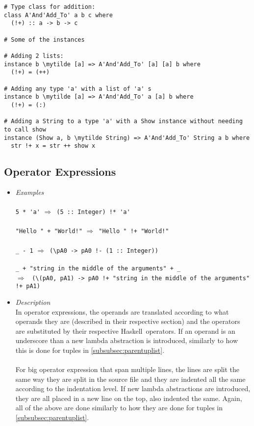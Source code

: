 \documentclass[diploma]{softlab-thesis}
\def\H{Haskell}
\def\lra{$\Longrightarrow$\ }
\newcommand{\mytilde}{$\sim$}
\begin{document}
\newpage
\begin{Verbatim}[commandchars=\\\{\}]
# Type class for addition:
class A'And'Add_To' a b c where
  (!+) :: a -> b -> c

# Some of the instances

# Adding 2 lists:
instance b \mytilde [a] => A'And'Add_To' [a] [a] b where
  (!+) = (++)

# Adding any type 'a' with a list of 'a' s
instance b \mytilde [a] => A'And'Add_To' a [a] b where
  (!+) = (:)

# Adding a String to a type 'a' with a Show instance without needing to call show
instance (Show a, b \mytilde String) => A'And'Add_To' String a b where
  str !+ x = str ++ show x

\end{Verbatim}

\subsection{Operator Expressions}

\begin{itemize}
\item
\textit{Examples}\\\\
\verb|5 * 'a'| \lra \verb|(5 :: Integer) !* 'a'|
\\\\
\verb|"Hello " + "World!"| \lra \verb|"Hello " !+ "World!"|
\\\\
\verb|_ - 1| \lra \verb|(\pA0 -> pA0 !- (1 :: Integer))|
\\\\
\verb|_ + "string in the middle of the arguments" + _|
\\\lra
\verb|(\(pA0, pA1) -> pA0 !+ "string in the middle of the arguments" !+ pA1)|
\\

\item
\textit{Description}\\

In operator expressions, the operands are translated according to what operands
they are (described in their respective section) and the operators are
substituted by their respective \H\ operators. If an operand is an underscore
than a new lambda abstraction is introduced, similarly to how this is done for
tuples in \ref{subsubsec:parentuplist}.
\\\\
For big operator expression that span multiple lines, the lines are split the
same way they are split in the source file and they are indented all the same
according to the indentation level. If new lambda abstractions are introduced,
they are all placed in a new line on the top, also indented the same. Again,
all of the above are done similarly to how they are done for tuples in
\ref{subsubsec:parentuplist}.

\end{itemize}
\end{document}
